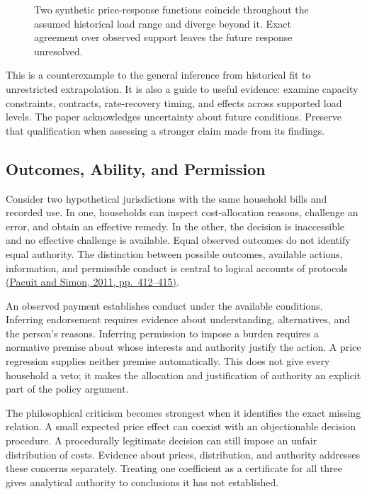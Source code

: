 \begin{figure}[htbp]
\centering

\caption{Two synthetic price-response functions coincide throughout the assumed historical load range and diverge beyond it. Exact agreement over observed support leaves the future response unresolved.}\label{fig:M09_counterexample_extrapolation}
\end{figure}

This is a counterexample to the general inference from historical fit to
unrestricted extrapolation. It is also a guide to useful evidence:
examine capacity constraints, contracts, rate-recovery timing, and
effects across supported load levels. The paper acknowledges uncertainty
about future conditions. Preserve that qualification when assessing a
stronger claim made from its findings.

\hypertarget{M09-outcomes-ability-and-permission}{%
\subsection{Outcomes, Ability, and
Permission}\label{M09-outcomes-ability-and-permission}}

\noindent \noindent Consider two hypothetical jurisdictions with the same
household bills and recorded use. In one, households can inspect
cost-allocation reasons, challenge an error, and obtain an effective
remedy. In the other, the decision is inaccessible and no effective
challenge is available. Equal observed outcomes do not identify equal
authority. The distinction between possible outcomes, available actions,
information, and permissible conduct is central to logical accounts of
protocols \href{https://doi.org/10.1017/S1755020311000190}{(Pacuit and
Simon, 2011, pp.~412--415)}.

An observed payment establishes conduct under the available conditions.
Inferring endorsement requires evidence about understanding,
alternatives, and the person's reasons. Inferring permission to impose a
burden requires a normative premise about whose interests and authority
justify the action. A price regression supplies neither premise
automatically. This does not give every household a veto; it makes the
allocation and justification of authority an explicit part of the policy
argument.

The philosophical criticism becomes strongest when it identifies the
exact missing relation. A small expected price effect can coexist with
an objectionable decision procedure. A procedurally legitimate decision
can still impose an unfair distribution of costs. Evidence about prices,
distribution, and authority addresses these concerns separately.
Treating one coefficient as a certificate for all three gives analytical
authority to conclusions it has not established.


